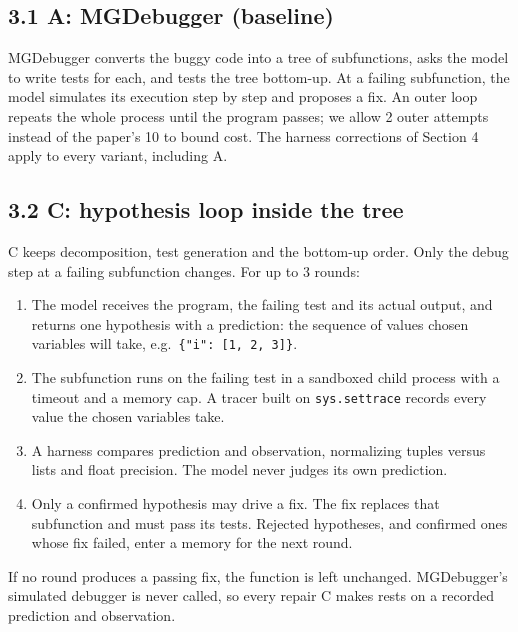 \documentclass[
  10pt,
  twocolumn]{article}
\providecommand{\tightlist}{%
  \setlength{\itemsep}{0pt}\setlength{\parskip}{0pt}}
\begin{document}
\hypertarget{a-mgdebugger-baseline}{%
\subsection{3.1 A: MGDebugger (baseline)}\label{a-mgdebugger-baseline}}

MGDebugger converts the buggy code into a tree of subfunctions, asks the
model to write tests for each, and tests the tree bottom-up. At a
failing subfunction, the model simulates its execution step by step and
proposes a fix. An outer loop repeats the whole process until the
program passes; we allow 2 outer attempts instead of the paper's 10 to
bound cost. The harness corrections of Section 4 apply to every variant,
including A.

\hypertarget{c-hypothesis-loop-inside-the-tree}{%
\subsection{3.2 C: hypothesis loop inside the
tree}\label{c-hypothesis-loop-inside-the-tree}}

C keeps decomposition, test generation and the bottom-up order. Only the
debug step at a failing subfunction changes. For up to 3 rounds:

\begin{enumerate}
\def\labelenumi{\arabic{enumi}.}
\tightlist
\item
  The model receives the program, the failing test and its actual
  output, and returns one hypothesis with a prediction: the sequence of
  values chosen variables will take,
  e.g.~\texttt{\{"i":\ {[}1,\ 2,\ 3{]}\}}.
\item
  The subfunction runs on the failing test in a sandboxed child process
  with a timeout and a memory cap. A tracer built on
  \texttt{sys.settrace} records every value the chosen variables take.
\item
  A harness compares prediction and observation, normalizing tuples
  versus lists and float precision. The model never judges its own
  prediction.
\item
  Only a confirmed hypothesis may drive a fix. The fix replaces that
  subfunction and must pass its tests. Rejected hypotheses, and
  confirmed ones whose fix failed, enter a memory for the next round.
\end{enumerate}

If no round produces a passing fix, the function is left unchanged.
MGDebugger's simulated debugger is never called, so every repair C makes
rests on a recorded prediction and observation.
\end{document}
